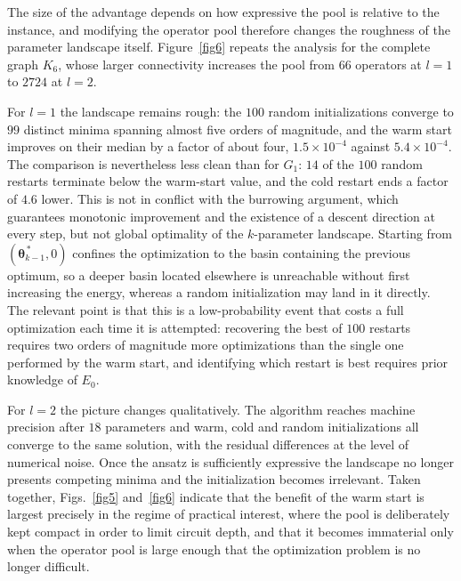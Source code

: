The size of the advantage depends on how expressive the pool is relative to the instance, and modifying the operator pool therefore changes the roughness of the parameter landscape itself. Figure~\ref{fig6} repeats the analysis for the complete graph $K_6$, whose larger connectivity increases the pool from $66$ operators at $l=1$ to $2724$ at $l=2$.

For $l=1$ the landscape remains rough: the $100$ random initializations converge to $99$ distinct minima spanning almost five orders of magnitude, and the warm start improves on their median by a factor of about four, $1.5\times10^{-4}$ against $5.4\times10^{-4}$. The comparison is nevertheless less clean than for $G_1$: $14$ of the $100$ random restarts terminate below the warm-start value, and the cold restart ends a factor of $4.6$ lower. This is not in conflict with the burrowing argument, which guarantees monotonic improvement and the existence of a descent direction at every step, but not global optimality of the $k$-parameter landscape. Starting from $(\boldsymbol{\theta}_{k-1}^{\,*},0)$ confines the optimization to the basin containing the previous optimum, so a deeper basin located elsewhere is unreachable without first increasing the energy, whereas a random initialization may land in it directly. The relevant point is that this is a low-probability event that costs a full optimization each time it is attempted: recovering the best of $100$ restarts requires two orders of magnitude more optimizations than the single one performed by the warm start, and identifying which restart is best requires prior knowledge of $E_0$.

For $l=2$ the picture changes qualitatively. The algorithm reaches machine precision after $18$ parameters and warm, cold and random initializations all converge to the same solution, with the residual differences at the level of numerical noise. Once the ansatz is sufficiently expressive the landscape no longer presents competing minima and the initialization becomes irrelevant. Taken together, Figs.~\ref{fig5} and~\ref{fig6} indicate that the benefit of the warm start is largest precisely in the regime of practical interest, where the pool is deliberately kept compact in order to limit circuit depth, and that it becomes immaterial only when the operator pool is large enough that the optimization problem is no longer difficult.



